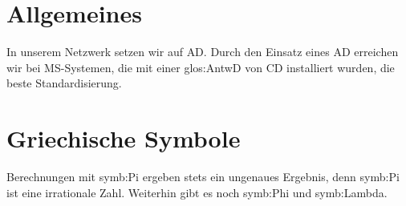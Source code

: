 \documentclass[a4paper]{scrartcl}
\begin{document}
\tableofcontents{}

\section{Allgemeines}
In unserem Netzwerk setzen wir auf \gls{AD}. Durch den Einsatz
eines \gls{AD} erreichen wir bei \gls{MS}-Systemen, die mit einer
\gls{glos:AntwD} von \gls{CD} installiert wurden, die beste Standardisierung.

\section{Griechische Symbole}
Berechnungen mit \gls{symb:Pi} ergeben stets ein ungenaues Ergebnis,
denn \gls{symb:Pi} ist eine irrationale Zahl. Weiterhin gibt es noch
\gls{symb:Phi} und \gls{symb:Lambda}.

\cleardoublepage{}

\printglossary[style=altlist,title=Glossar]

\printglossary[type=\acronymtype,style=long]

\printglossary[type=symbolslist,style=long]
\end{document}
